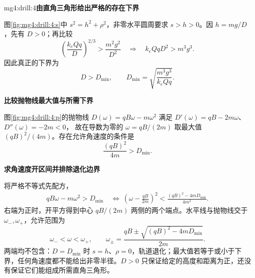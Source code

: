\begin{drillsolution}{mg4:drill:4}\textbf{由直角三角形给出严格的存在下界}\par\nobreak
图\ref{fig:mg4:drill:4:s}中 $s^2=h^2+\rho^2$，非零水平圆周要求 $s>h>0$。因 $h=mg/D$，先有 $D>0$；再比较
\[
\left(\frac{k_eQq}{D}\right)^{2/3}>\frac{m^2g^2}{D^2}
\quad\Longrightarrow\quad k_eQqD^2>m^3g^3.
\]
因此真正的下界为
\[
\boxed{D>D_{\min},\qquad D_{\min}=\sqrt{\frac{m^3g^3}{k_eQq}}}.
\]


\par\medskip{}\noindent\textbf{比较抛物线最大值与所需下界}\par\nobreak
图\ref{fig:mg4:drill:4:p}的抛物线 $D(\omega)=qB\omega-m\omega^2$ 满足
$D'(\omega)=qB-2m\omega$、$D''(\omega)=-2m<0$，
故在导数为零的 $\omega=qB/(2m)$ 取最大值 $(qB)^2/(4m)$。存在允许角速度的条件是
\[
\boxed{\frac{(qB)^2}{4m}>D_{\min}}.
\]


\par\medskip{}\noindent\textbf{求角速度开区间并排除退化边界}\par\nobreak
将严格不等式先配方，
\[
 \begin{aligned}
 qB\omega-m\omega^2>D_{\min}
 &\ \Longleftrightarrow\
 \left(\omega-\frac{qB}{2m}\right)^2
 <\frac{(qB)^2-4mD_{\min}}{4m^2}.
 \end{aligned}
\]
右端为正时，开平方得到中心 $qB/(2m)$ 两侧的两个端点。水平线与抛物线交于 $\omega_-,\omega_+$，允许范围为
\[
\boxed{\omega_-<\omega<\omega_+,\qquad
\omega_\pm=\frac{qB\pm\sqrt{(qB)^2-4mD_{\min}}}{2m}}.
\]
两端均不包含：$D=D_{\min}$ 时 $s=h$、$\rho=0$，轨道退化；最大值若等于或小于下界，任何角速度都不能给出非零半径。$D>0$ 只保证给定的高度和距离为正，还没有保证它们能组成所需直角三角形。\end{drillsolution}

